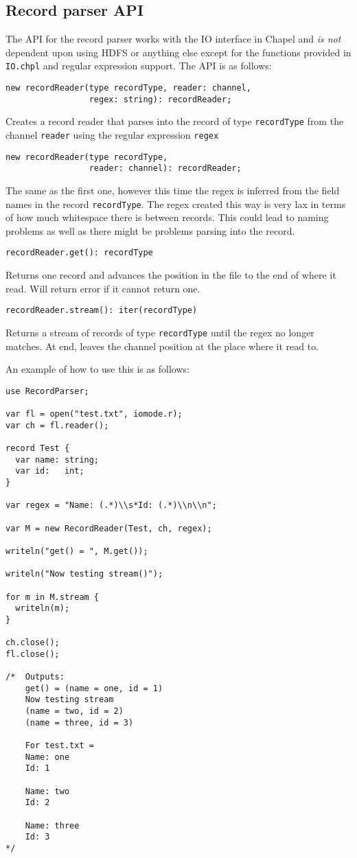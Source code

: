 \subsection{Record parser API}
The API for the record parser works with the IO interface in Chapel and
\emph{is not} dependent upon using HDFS or anything else except for the
functions provided in {\tt IO.chpl} and regular expression support. The
API is as follows:
\begin{lstlisting}
new recordReader(type recordType, reader: channel, 
                 regex: string): recordReader;
\end{lstlisting}
Creates a record reader that parses into the record of type {\tt recordType}
from the channel {\tt reader} using the regular expression {\tt regex}
\begin{lstlisting}
new recordReader(type recordType, 
                 reader: channel): recordReader;
\end{lstlisting}
The same as the first one, however this time the regex is inferred from the
field names in the record {\tt recordType}. The regex created this way is very
lax in terms of how much whitespace there is between records. This could lead to naming problems as
well as there might be problems parsing into the record. 

\begin{lstlisting}
recordReader.get(): recordType
\end{lstlisting}
Returns one record and advances the position in the file to the end of
where it read. Will return error if it cannot return one.

\begin{lstlisting}
recordReader.stream(): iter(recordType)
\end{lstlisting}
Returns a stream of records of type {\tt recordType} until the regex no longer
matches. At end, leaves the channel position at the place where it read to.  

An example of how to use this is as follows:
\begin{lstlisting}
use RecordParser;

var fl = open("test.txt", iomode.r);
var ch = fl.reader();

record Test {
  var name: string;
  var id:   int;
}

var regex = "Name: (.*)\\s*Id: (.*)\\n\\n";

var M = new RecordReader(Test, ch, regex);

writeln("get() = ", M.get());

writeln("Now testing stream()");

for m in M.stream {
  writeln(m);
}

ch.close();
fl.close();

/*  Outputs: 
    get() = (name = one, id = 1)
    Now testing stream
    (name = two, id = 2)
    (name = three, id = 3)

    For test.txt = 
    Name: one
    Id: 1

    Name: two
    Id: 2

    Name: three
    Id: 3
*/
\end{lstlisting}

